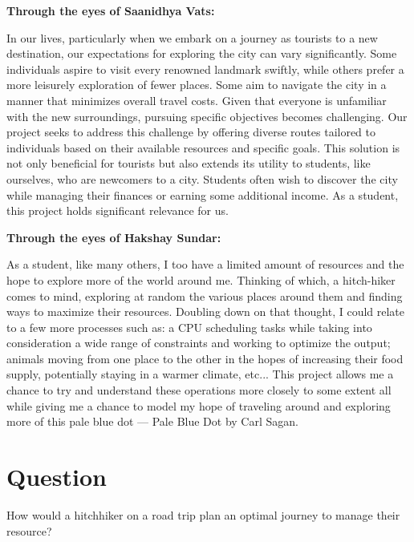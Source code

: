 \documentclass[
]{article}
\begin{document}
\textbf{Through the eyes of Saanidhya Vats:}

In our lives, particularly when we embark on a journey as tourists to a
new destination, our expectations for exploring the city can vary
significantly. Some individuals aspire to visit every renowned landmark
swiftly, while others prefer a more leisurely exploration of fewer
places. Some aim to navigate the city in a manner that minimizes overall
travel costs. Given that everyone is unfamiliar with the new
surroundings, pursuing specific objectives becomes challenging. Our
project seeks to address this challenge by offering diverse routes
tailored to individuals based on their available resources and specific
goals. This solution is not only beneficial for tourists but also
extends its utility to students, like ourselves, who are newcomers to a
city. Students often wish to discover the city while managing their
finances or earning some additional income. As a student, this project
holds significant relevance for us.

\textbf{Through the eyes of Hakshay Sundar:}

As a student, like many others, I too have a limited amount of resources
and the hope to explore more of the world around me. Thinking of which,
a hitch-hiker comes to mind, exploring at random the various places
around them and finding ways to maximize their resources. Doubling down
on that thought, I could relate to a few more processes such as: a CPU
scheduling tasks while taking into consideration a wide range of
constraints and working to optimize the output; animals moving from one
place to the other in the hopes of increasing their food supply,
potentially staying in a warmer climate, etc... This project allows me a
chance to try and understand these operations more closely to some
extent all while giving me a chance to model my hope of traveling around
and exploring more of this pale blue dot --- Pale Blue Dot by Carl
Sagan.

\section{Question}\label{question}

How would a hitchhiker on a road trip plan an optimal journey to manage
their resource?
\end{document}
